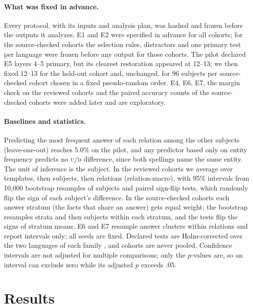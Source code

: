 \documentclass[11pt]{article}
\newcommand{\U}{\textsc{u}}
\newcommand{\D}{\textsc{d}}
\begin{document}
\paragraph{What was fixed in advance.}
Every protocol, with its inputs and analysis plan, was hashed and frozen before
the outputs it analyzes. E1 and E2 were specified in advance for all cohorts; for
the source-checked cohorts the selection rules, distractors and one primary test
per language were frozen before any output for those cohorts. The pilot declared
E5 layers 4--5 primary, but its clearest restoration appeared at 12--13; we then
fixed 12--13 for the held-out cohort and, unchanged, for 96 subjects per
source-checked cohort chosen in a fixed pseudo-random order. E4, E6, E7, the
margin check on the reviewed cohorts and the paired accuracy counts of the
source-checked cohorts were added later and are exploratory.

\paragraph{Baselines and statistics.}
Predicting the most frequent answer of each relation among the other subjects
(leave-one-out) reaches 5.0\% on the pilot, and any predictor based only on entity frequency
predicts no \U/\D{} difference, since both spellings name the same entity. The unit of inference is the subject. In the reviewed
cohorts we average over templates, then subjects, then relations
(relation-macro), with 95\% intervals from 10{,}000 bootstrap resamples of
subjects \citep{efron-tibshirani-1993-bootstrap,cameron-etal-2008-bootstrap} and
paired sign-flip tests, which randomly flip the sign of each subject's
difference. In the source-checked cohorts each answer stratum (the facts that
share an answer) gets equal weight; the bootstrap resamples strata and then
subjects within each stratum, and the tests flip the signs of stratum means. E6 and E7 resample answer clusters within
relations and report intervals only; all seeds are fixed. Declared tests are
Holm-corrected over the two languages of each family
\citep{holm-1979-simple,dror-etal-2018-hitchhikers}, and cohorts are never
pooled. Confidence intervals are not adjusted for multiple comparisons; only the
$p$-values are, so an interval can exclude zero while its adjusted $p$ exceeds
.05.

\section{Results}
\label{sec:results}
\end{document}
